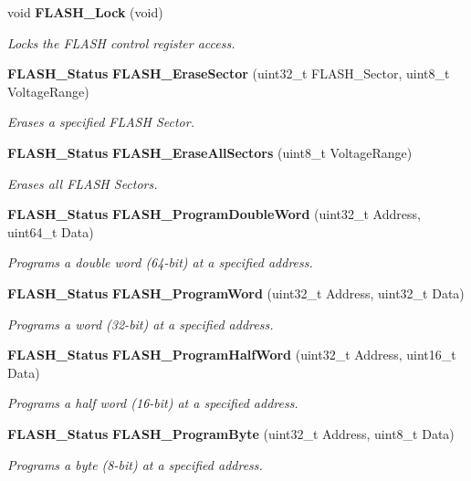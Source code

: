 \begin{DoxyCompactItemize}
void \textbf{ F\+L\+A\+S\+H\+\_\+\+Lock} (void)
\begin{DoxyCompactList}\small\item\em Locks the F\+L\+A\+SH control register access. \end{DoxyCompactList}\item 
\textbf{ F\+L\+A\+S\+H\+\_\+\+Status} \textbf{ F\+L\+A\+S\+H\+\_\+\+Erase\+Sector} (uint32\+\_\+t F\+L\+A\+S\+H\+\_\+\+Sector, uint8\+\_\+t Voltage\+Range)
\begin{DoxyCompactList}\small\item\em Erases a specified F\+L\+A\+SH Sector. \end{DoxyCompactList}\item 
\textbf{ F\+L\+A\+S\+H\+\_\+\+Status} \textbf{ F\+L\+A\+S\+H\+\_\+\+Erase\+All\+Sectors} (uint8\+\_\+t Voltage\+Range)
\begin{DoxyCompactList}\small\item\em Erases all F\+L\+A\+SH Sectors. \end{DoxyCompactList}\item 
\textbf{ F\+L\+A\+S\+H\+\_\+\+Status} \textbf{ F\+L\+A\+S\+H\+\_\+\+Program\+Double\+Word} (uint32\+\_\+t Address, uint64\+\_\+t Data)
\begin{DoxyCompactList}\small\item\em Programs a double word (64-\/bit) at a specified address. \end{DoxyCompactList}\item 
\textbf{ F\+L\+A\+S\+H\+\_\+\+Status} \textbf{ F\+L\+A\+S\+H\+\_\+\+Program\+Word} (uint32\+\_\+t Address, uint32\+\_\+t Data)
\begin{DoxyCompactList}\small\item\em Programs a word (32-\/bit) at a specified address. \end{DoxyCompactList}\item 
\textbf{ F\+L\+A\+S\+H\+\_\+\+Status} \textbf{ F\+L\+A\+S\+H\+\_\+\+Program\+Half\+Word} (uint32\+\_\+t Address, uint16\+\_\+t Data)
\begin{DoxyCompactList}\small\item\em Programs a half word (16-\/bit) at a specified address. \end{DoxyCompactList}\item 
\textbf{ F\+L\+A\+S\+H\+\_\+\+Status} \textbf{ F\+L\+A\+S\+H\+\_\+\+Program\+Byte} (uint32\+\_\+t Address, uint8\+\_\+t Data)
\begin{DoxyCompactList}\small\item\em Programs a byte (8-\/bit) at a specified address. \end{DoxyCompactList}\item 

\end{DoxyCompactItemize}

